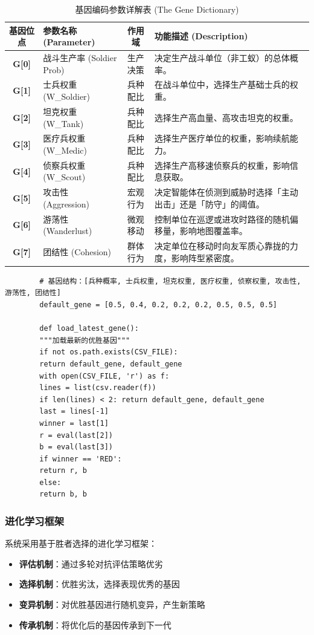 \documentclass[12pt,a4paper]{article}
\begin{document}
	\begin{table}[htbp]
		\centering
		\caption{基因编码参数详解表 (The Gene Dictionary)}
		\label{tab:gene_dictionary}
		\renewcommand{\arraystretch}{1.3} %
		\begin{tabular}{c l c p{7.5cm}}
			\toprule
			\textbf{基因位点} & \textbf{参数名称 (Parameter)} & \textbf{作用域} & \textbf{功能描述 (Description)} \\
			\midrule
			\textbf{G[0]} & 战斗生产率 (Soldier Prob) & 生产决策 & 决定生产战斗单位（非工蚁）的总体概率。 \\
			\textbf{G[1]} & 士兵权重 (W\_Soldier) & 兵种配比 & 在战斗单位中，选择生产基础士兵的权重。 \\
			\textbf{G[2]} & 坦克权重 (W\_Tank) & 兵种配比 & 选择生产高血量、高攻击坦克的权重。 \\
			\textbf{G[3]} & 医疗兵权重 (W\_Medic) & 兵种配比 & 选择生产医疗单位的权重，影响续航能力。 \\
			\textbf{G[4]} & 侦察兵权重 (W\_Scout) & 兵种配比 & 选择生产高移速侦察兵的权重，影响信息获取。 \\
			\textbf{G[5]} & 攻击性 (Aggression) & 宏观行为 & 决定智能体在侦测到威胁时选择「主动出击」还是「防守」的阈值。 \\
			\textbf{G[6]} & 游荡性 (Wanderlust) & 微观移动 & 控制单位在巡逻或进攻时路径的随机偏移量，影响地图覆盖率。 \\
			\textbf{G[7]} & 团结性 (Cohesion) & 群体行为 & 决定单位在移动时向友军质心靠拢的力度，影响阵型紧密度。 \\
			\bottomrule
		\end{tabular}
	\end{table}
	
	\begin{verbatim}
		# 基因结构：[兵种概率, 士兵权重, 坦克权重, 医疗权重, 侦察权重, 攻击性, 游荡性, 团结性]
		default_gene = [0.5, 0.4, 0.2, 0.2, 0.2, 0.5, 0.5, 0.5]
		
		def load_latest_gene():
		"""加载最新的优胜基因"""
		if not os.path.exists(CSV_FILE): 
		return default_gene, default_gene
		with open(CSV_FILE, 'r') as f:
		lines = list(csv.reader(f))
		if len(lines) < 2: return default_gene, default_gene
		last = lines[-1]
		winner = last[1]
		r = eval(last[2])
		b = eval(last[3])
		if winner == 'RED':
		return r, b
		else:
		return b, b
	\end{verbatim}
	
	\subsubsection{进化学习框架}
	系统采用基于胜者选择的进化学习框架：
	\begin{itemize}
		\item \textbf{评估机制}：通过多轮对抗评估策略优劣
		\item \textbf{选择机制}：优胜劣汰，选择表现优秀的基因
		\item \textbf{变异机制}：对优胜基因进行随机变异，产生新策略
		\item \textbf{传承机制}：将优化后的基因传承到下一代
	\end{itemize}
	
\end{document}
